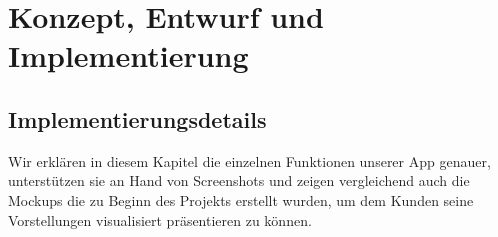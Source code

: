 \chapter{Konzept, Entwurf und Implementierung}
\label{cha:implementierung}

\section{Implementierungsdetails}
\label{sec:implementierung:implementierungsdetails}

Wir erklären in diesem Kapitel die einzelnen Funktionen unserer App genauer, unterstützen sie an Hand von Screenshots und zeigen vergleichend auch die Mockups die zu Beginn des Projekts erstellt wurden, um dem Kunden seine Vorstellungen visualisiert präsentieren zu können.\\

